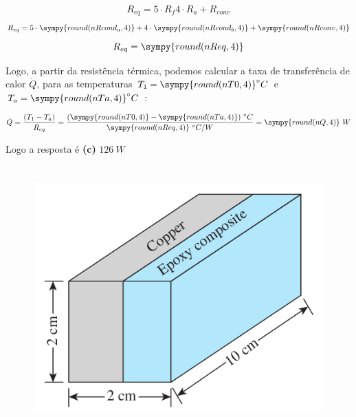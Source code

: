 \documentclass[a4paper,11pt]{article}
\newcommand{\npy}[1]{\sympy{round(n#1,4)}}
\begin{document}
$$R_{eq} = 5\cdot R_{f} 4\cdot R_{a} + R_{conv}$$
$$R_{eq} = 5\cdot \npy{Rcond_a} + 4\cdot \npy{Rcond_b} + \npy{Rconv}$$
$$R_{eq} = \npy{Req}$$

Logo, a partir da resistência térmica, podemos calcular a taxa de transferência de calor $\dot{Q}$, para as temperaturas $T_1 = \npy{T0}^\circ C$ e $T_a = \npy{Ta}^\circ C$ :

$$\dot{Q} = \frac{(T_1 - T_a)}{R_{eq}} = \frac{(\npy{T0} - \npy{Ta})\ ^\circ C}{\npy{Req}\ ^\circ C/W} = \npy{Q}\ W$$

Logo a resposta é \textbf{(c)} $126\ W$

\section{} %

\begin{figure}[H]
\centering
\includegraphics[width = 0.6\linewidth]{./image/lista1/q13}
\end{figure}
\end{document}
